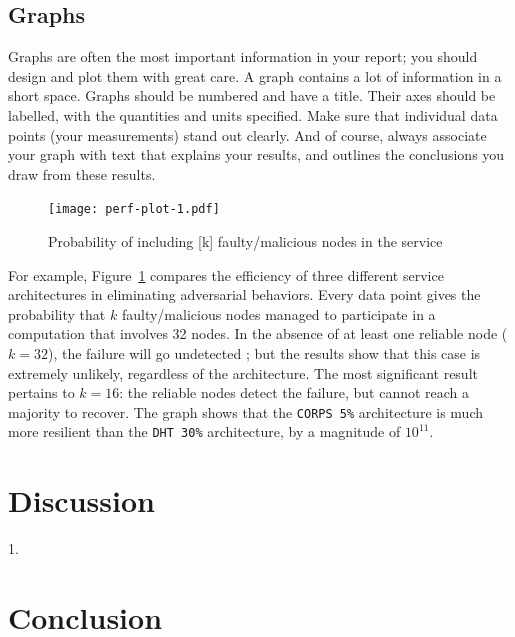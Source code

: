 \documentclass{scrartcl}
\begin{document}
\subsection{Graphs}

Graphs are often the most important information in your report; you should design and plot them with great care. A graph contains a lot of information in a short space. Graphs should be numbered and have a title. Their axes should be labelled, with the quantities and units specified. Make sure that individual data points (your measurements) stand out clearly. And of course, always associate your graph with text that explains your results, and outlines the conclusions you draw from these results.

\begin{figure}
	\begin{center}
		\texttt{[image: perf-plot-1.pdf]}
	\end{center}
	\caption{Probability of including [k] faulty/malicious nodes in the service}
	\label{graph:faulty-proportion-plot}
\end{figure}

For example, Figure~\ref{graph:faulty-proportion-plot} compares the efficiency of three different service architectures in eliminating adversarial behaviors. Every data point gives the probability that $k$ faulty/malicious nodes managed to participate in a computation that involves 32 nodes. In the absence of at least one reliable node ($k = 32$), the failure will go undetected ; but the results show that this case is extremely unlikely, regardless of the architecture. The most significant result pertains to $k = 16$: the reliable nodes detect the failure, but cannot reach a majority to recover. The graph shows that the \texttt{CORPS 5\%} architecture is much more resilient than the \texttt{DHT 30\%} architecture, by a magnitude of $10^{11}$.


\section{Discussion}
1. 

\section{Conclusion}






\end{document}
